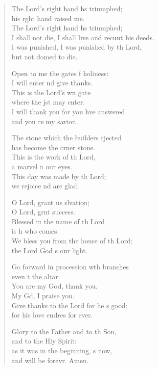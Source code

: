 \begin{verse}
\begin{patverse}
    The Lord’s right hand hs triumphed;\Med\\
    his r\pointup{\i}ght hand raised me.\\
    The Lord’s right hand hs triumphed;\Med\\
    I shall not die, I shall live and recunt his deeds.\\
    I was punished, I was punished by th Lord,\Med\\
    but not domed to die.

    Open to me the gates f holiness:\Med\\
    I will enter nd give thanks.\\
    This is the Lord’s wn gate\Med\\
    where the jst may enter.\\
    I will thank you for you hve answered\Med\\
    and you re my savior.

    The stone which the builders rjected\Med\\
    has become the crner stone.\\
    This is the work of th Lord,\Med\\
    a marvel \pointup{\i}n our eyes.\\
    This day was made by th Lord;\Med\\
    we rejoice nd are glad.

    O Lord, grant us slvation;\Med\\
    O Lord, grnt success.\\
    Blessed in the name of th Lord\Med\\
    is h who comes.\\
    We bless you from the house of th Lord;\Med\\
    the Lord God \pointup{\i}s our light.

    Go forward in procession w\pointup{\i}th branches\Med\\
    even t the altar.\\
    You are my God,  thank you.\Med\\
    My Gd, I praise you.\\
    Give thanks to the Lord for he \pointup{\i}s good;\Med\\
    for his love endres for ever.

    Glory to the Father and to th Son,\Med\\
    and to the Hly Spirit:\\
    as it was in the beginning, \pointup{\i}s now,\Med\\
    and will be forevr. Amen.
  \end{patverse}
\end{verse}

